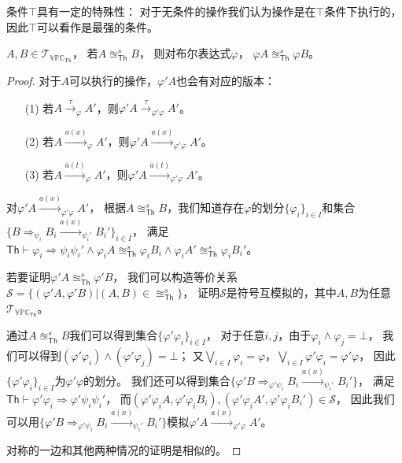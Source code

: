    条件$\top$具有一定的特殊性：
   对于无条件的操作我们认为操作是在$\top$条件下执行的，
   因此$\top$可以看作是最强的条件。
   \begin{corollary}\label{co:condition0}
      $A,B\in \mathcal{T}_{\mathbb{VPC}_{\mathsf{Th}}}$，
      若$A\approxeq_{\mathsf{Th}}^s B$，
      则对布尔表达式$\varphi$，
      $\varphi A\approxeq_{\mathsf{Th}}^s\varphi B$。
   \end{corollary}
   \begin{proof}
      对于$A$可以执行的操作，$\varphi' A$也会有对应的版本：
      \begin{itemize}
         \item[(1)] 若$A\stackrel{\tau}{\rightarrow}_{\varphi} A'$，则$\varphi' A\stackrel{\tau}{\rightarrow}_{\varphi' \varphi}A'$。
         \item[(2)] 若$A\stackrel{a(x)}{\rightarrow}_{\varphi} A'$，则$\varphi' A\stackrel{a(x)}{\rightarrow}_{\varphi' \varphi} A'$。
         \item[(3)] 若$A\stackrel{\overline{a}(t)}{\rightarrow}_{\varphi} A'$，则$\varphi' A\stackrel{\overline{a}(t)}{\rightarrow}_{\varphi' \varphi} A'$。
      \end{itemize}
      对$\varphi' A\stackrel{a(x)}{\rightarrow}_{\varphi'\varphi} A'$，
      根据$A\approxeq_{\mathsf{Th}}^sB$，我们知道存在$\varphi$的划分$\{\varphi_i\}_{i\in I}$和集合$\{B\Rightarrow_{\psi_i}B_i\stackrel{a(x)}{\rightarrow}_{\psi_i'}B_i'\}_{i\in I}$，
      满足$\mathsf{Th}\vdash \varphi_i\Rightarrow \psi_i \psi_i' \wedge \varphi_i A\approxeq_{\mathsf{Th}}^s \varphi_i B_i \wedge \varphi_i A'\approxeq_{\mathsf{Th}}^s \varphi_i B_i'$。
      
      若要证明$\varphi' A\approxeq_{\mathsf{Th}}^s\varphi' B$，
      我们可以构造等价关系$\mathcal{S} = \{(\varphi'A,\varphi'B)|(A,B)\in \approxeq_{\mathsf{Th}}^s\}$，
      证明$\mathcal{S}$是符号互模拟的，其中$A,B$为任意$\mathcal{T}_{\mathbb{VPC}_{\mathsf{Th}}}$。

      通过$A\approxeq_{\mathsf{Th}}^sB$我们可以得到集合$\{\varphi'\varphi_i\}_{i\in I}$，
      对于任意$i,j$，由于$\varphi_i \wedge \varphi_j = \bot$，
      我们可以得到$(\varphi'\varphi_i) \wedge (\varphi'\varphi_j) = \bot$；
      又$\bigvee_{i\in I}\varphi_i = \varphi$，$\bigvee_{i\in I}\varphi'\varphi_i = \varphi'\varphi$，
      因此$\{\varphi'\varphi_i\}_{i\in I}$为$\varphi'\varphi$的划分。
      我们还可以得到集合$\{\varphi'B\Rightarrow_{\varphi'\psi_i}B_i\stackrel{a(x)}{\rightarrow}_{\psi_i'} B_i'\}$，
      满足$\mathsf{Th}\vdash \varphi'\varphi_i\Rightarrow \varphi'\psi_i\psi_i'$，
      而$(\varphi'\varphi_i A, \varphi'\varphi_i B_i),(\varphi'\varphi_i A', \varphi'\varphi_i B_i')\in \mathcal{S}$，
      因此我们可以用$\{\varphi'B\Rightarrow_{\varphi'\psi_i}B_i\stackrel{a(x)}{\rightarrow}_{\psi_i'} B_i'\}$模拟$\varphi' A\stackrel{a(x)}{\rightarrow}_{\varphi'\varphi} A'$。

      对称的一边和其他两种情况的证明是相似的。
   \end{proof}

